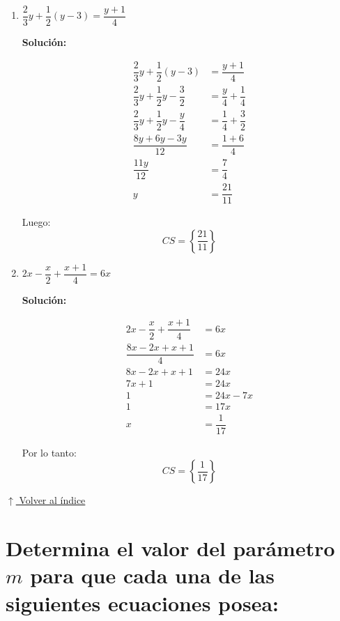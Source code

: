 \documentclass[12pt]{article}
\newcommand{\solucion}{%
    \vspace{0.8em}%
    \textbf{Solución:}%
}
\newcommand{\volverindice}{%
    \vspace{1em}%
    \begin{flushright}%
        \hyperlink{indice}{\small $\uparrow$ Volver al índice}%
    \end{flushright}%
}
\begin{document}
\begin{enumerate}[label=\alph*.-]
    En este caso no existe solución porque cualquier valor de $x$ multiplicado por cero será $0$ (nunca $4$).
    \[
    \boxed{CS = \emptyset}
    \]

    \newpage
    \item $\dfrac{2}{3}y + \dfrac{1}{2}(y - 3) = \dfrac{y+1}{4}$

    \solucion

    \begin{align*}
    \dfrac{2}{3}y + \dfrac{1}{2}(y-3) &= \dfrac{y+1}{4} \\[0.3em]
    \dfrac{2}{3}y + \dfrac{1}{2}y - \dfrac{3}{2} &= \dfrac{y}{4} + \dfrac{1}{4} \\[0.3em]
    \dfrac{2}{3}y + \dfrac{1}{2}y - \dfrac{y}{4} &= \dfrac{1}{4} + \dfrac{3}{2} \\[0.3em]
    \dfrac{8y + 6y - 3y}{12} &= \dfrac{1 + 6}{4} \\[0.3em]
    \dfrac{11y}{12} &= \dfrac{7}{4} \\[0.3em]
    y &= \dfrac{21}{11}
    \end{align*}

    Luego:
    \[
    \boxed{CS = \left\{\dfrac{21}{11}\right\}}
    \]

    \item $2x - \dfrac{x}{2} + \dfrac{x+1}{4} = 6x$

    \solucion

    \begin{align*}
    2x - \dfrac{x}{2} + \dfrac{x+1}{4} &= 6x \\[0.3em]
    \dfrac{8x - 2x + x + 1}{4} &= 6x \\[0.3em]
    8x - 2x + x + 1 &= 24x \\[0.3em]
    7x + 1 &= 24x \\[0.3em]
    1 &= 24x - 7x \\[0.3em]
    1 &= 17x \\[0.3em]
    x &= \dfrac{1}{17}
    \end{align*}

    Por lo tanto:
    \[
    \boxed{CS = \left\{\dfrac{1}{17}\right\}}
    \]
\end{enumerate}
\volverindice
\newpage

\section[Parámetro m en ecuaciones]{Determina el valor del parámetro $m$ para que cada una de las siguientes ecuaciones posea:}
\end{document}
